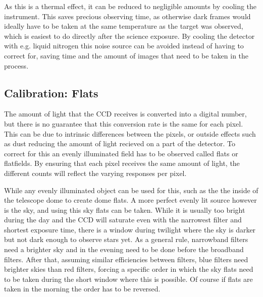 \documentclass[a4paper,oneside,12pt, class=Latex/Classes/PhDthesisPSnPDF, crop=false]{standalone}
\begin{document}
As this is a thermal effect, it can be reduced to negligible amounts by cooling the instrument. This saves precious observing time, as otherwise dark frames would ideally have to be taken at the same temperature as the target was observed, which is easiest to do directly after the science exposure. By cooling the detector with e.g. liquid nitrogen this noise source can be avoided instead of having to correct for, saving time and the amount of images that need to be taken in the process.


\subsection{Calibration: Flats}
The amount of light that the CCD receives is converted into a digital number, but there is no guarantee that this conversion rate is the same for each pixel. This can be due to intrinsic differences between the pixels, or outside effects such as dust reducing the amount of light recieved on a part of the detector. To correct for this an evenly illuminated field has to be observed called flats or flatfields. By ensuring that each pixel receives the same amount of light, the different counts will reflect the varying responses per pixel.

While any evenly illuminated object can be used for this, such as the the inside of the telescope dome to create dome flats. A more perfect evenly lit source however is the sky, and using this sky flats can be taken. While it is usually too bright during the day and the CCD will saturate even with the narrowest filter and shortest exposure time, there is a window during twilight where the sky is darker but not dark enough to observe stars yet. As a general rule, narrowband filters need a brighter sky and in the evening need to be done before the broadband filters. After that, assuming similar efficiencies between filters, blue filters need brighter skies than red filters, forcing a specific order in which the sky flats need to be taken during the short window where this is possible. Of course if flats are taken in the morning the order has to be reversed.
\end{document}
